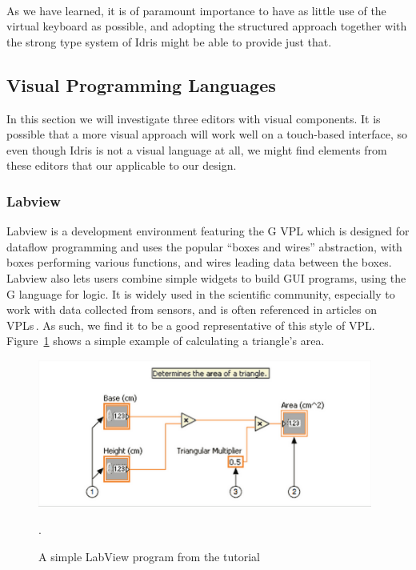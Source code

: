 \paragraph{}

As we have learned, it is of paramount importance to have as little use of the virtual keyboard as possible, and adopting the structured approach together with the strong type system of Idris might be able to provide just that.

\subsection{Visual Programming Languages} %
\label{sub:visual_programming_languages}
In this section we will investigate three editors with visual components.
It is possible that a more visual approach will work well on a touch-based interface, so even though Idris is not a visual language at all, we might find elements from these editors that our applicable to our design.

\subsubsection{Labview}
\label{subsub:Labview}
Labview is a development environment featuring the G VPL which is designed for dataflow programming and uses the popular ``boxes and wires'' abstraction, with boxes performing various functions, and wires leading data between the boxes.
Labview also lets users combine simple widgets to build GUI programs, using the G language for logic.
It is widely used in the scientific community, especially to work with data collected from sensors, and is often referenced in articles on VPLs\,\cite{Green96usabilityanalysis,DBLP:journals/ijmms/PetreB99}.
As such, we find it to be a good representative of this style of VPL\@.
Figure~\ref{fig:LabViewGettingStarted} shows a simple example of calculating a
triangle's area.

\begin{figure}[h]
\centering
\includegraphics[width=110mm]{diagrams/LabView_screenshot.png}
\caption{A simple LabView program from the tutorial\,\cite{LabView:GettingStarted}}.
\label{fig:LabViewGettingStarted}
\end{figure}

